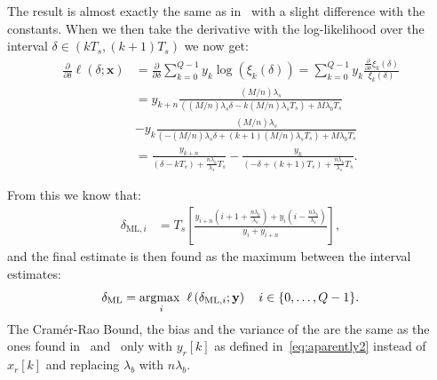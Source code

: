 \noindent
The result is almost exactly the same as in~ with a slight difference with the constants. When we then take the derivative with the log-likelihood over the interval \(\delta \in(kT_s,(k+1)T_s)\) we now get:
\begin{equation}
\begin{aligned}
\frac{\partial}{\partial \delta} \ell(\delta ; \mathbf{x})
&= \frac{\partial}{\partial \delta}\sum_{k=0}^{Q-1} y_k \log \left( \xi_k(\delta)\right)
=  \sum_{k=0}^{Q-1}y_k\frac{ \frac{\partial}{\partial \delta}\xi_k(\delta)}{\xi_k(\delta)}\\
&= y_{k+n} \frac{(M/n)\lambda_s}{\left((M/n)\lambda_s \delta-k (M/n)\lambda_s T_s\right)+M\lambda_b T_s}\\
&-y_k \frac{(M/n)\lambda_s}{\left(-(M/n)\lambda_s \delta+(k+1) (M/n)\lambda_s T_s\right)+M\lambda_b T_s}\\
&= \frac{y_{k+n}}{\left( \delta-k  T_s\right)+\frac{n\lambda_b}{\lambda_s} T_s}- \frac{y_k}{\left(- \delta+(k+1)  T_s\right)+\frac{n\lambda_b}{\lambda_s} T_s}.
\end{aligned}
\end{equation}

\noindent
From this we know that:
\begin{equation}
\begin{aligned}
\delta_{\mathrm{ML}, i}
&=T_s\left[\frac{y_{i+n}\left(i+1 +\frac{n\lambda_b}{\lambda_s} \right)+y_i\left(i -\frac{n\lambda_b}{\lambda_s} \right)}{y_i+y_{i+n}}\right],
\end{aligned} 
\end{equation}
and the final estimate is then found as the maximum between the interval estimates:
\begin{equation}
\delta_{\mathrm{ML}}=\underset{i}{\operatorname*{argmax\;}} \; \ell\left(\delta_{\mathrm{ML}, i} ; \mathbf{y}\right) \quad i\in\{0, \ldots, Q-1\}.
\end{equation}
The Cramér-Rao Bound, the bias and the variance of the are the same as the ones found in~ and~ only with \(y_r[k]\) as defined in~\eqref{eq:aparently2} instead of \(x_r[k]\) and replacing \(\lambda_b\) with \(n\lambda_b\).